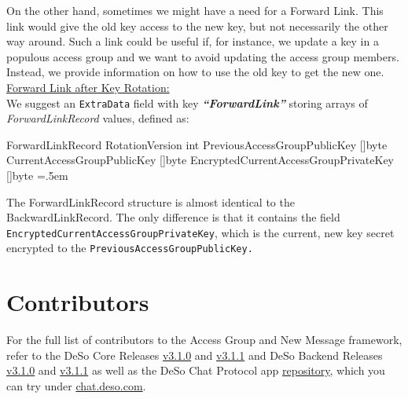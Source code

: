 \documentclass[oneside, 12pt]{article}
\newenvironment{lcverbatim}
 {\SaveVerbatim{cverb}}
 {\endSaveVerbatim
  \flushleft\fboxrule=0pt\fboxsep=.5em
  \colorbox{cverbbg}{%
    \makebox[\dimexpr\linewidth-2\fboxsep][l]{\BUseVerbatim{cverb}}%
  }
  \endflushleft
}
\begin{document}
\noindent On the other hand, sometimes we might have a need for a Forward Link. This link would give the old key access to the new key, but not necessarily the other way around. Such a link could be useful if, for instance, we update a key in a populous access group and we want to avoid updating the access group members. Instead, we provide information on how to use the old key to get the new one.\\

\noindent\underline{Forward Link after Key Rotation:}\\
\noindent We suggest an \texttt{ExtraData} field with key \textbf{\textit{“ForwardLink”}} storing arrays of \textit{ForwardLinkRecord} values, defined as:

\begin{lcverbatim}
ForwardLinkRecord
{
    RotationVersion                       int
    PreviousAccessGroupPublicKey          []byte
    CurrentAccessGroupPublicKey           []byte
    EncryptedCurrentAccessGroupPrivateKey []byte
}
\end{lcverbatim}

\noindent The ForwardLinkRecord structure is almost identical to the BackwardLinkRecord. The only difference is that it contains the field \texttt{EncryptedCurrentAccessGroupPrivateKey}, which is the current, new key secret encrypted to the \texttt{PreviousAccessGroupPublicKey.}

\section{Contributors}
For the full list of contributors to the Access Group and New Message framework, refer to the DeSo Core Releases \href{https://github.com/deso-protocol/core/releases/tag/v3.1.0}{v3.1.0} and \href{https://github.com/deso-protocol/core/releases/tag/v3.1.1}{v3.1.1} and DeSo Backend Releases \href{https://github.com/deso-protocol/backend/releases/tag/v3.1.0}{v3.1.0} and \href{https://github.com/deso-protocol/backend/releases/tag/v3.1.1}{v3.1.1} as well as the DeSo Chat Protocol app \href{https://github.com/deso-protocol/deso-chat-protocol}{repository}, which you can try under \href{https://chat.deso.com}{chat.deso.com}.
\end{document}

